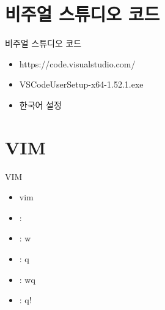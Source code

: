 \documentclass[aspectratio=1610,20pt,xcolor=pdftex,dvipsnames,table,handout]{beamer}
\begin{document}
		\section{비주얼 스튜디오 코드}


		\begin{frame} [t,plain]

			\begin{block} {비주얼 스튜디오 코드}
			\setlength{\leftmargini}{2em}			
			\begin{itemize}
				\item https://code.visualstudio.com/
				\item VSCodeUserSetup-x64-1.52.1.exe
				\item  한국어 설정

			\end{itemize}
			\end{block}						

		\end{frame}						


		\section{VIM}


		\begin{frame} [t,plain]

			\begin{block} {VIM}
			\setlength{\leftmargini}{2em}			
			\begin{itemize}
				\item vim
				\item : 
				\item : w
				\item : q
				\item : wq
				\item : q!
			\end{itemize}
			\end{block}						

		\end{frame}						
\end{document}
